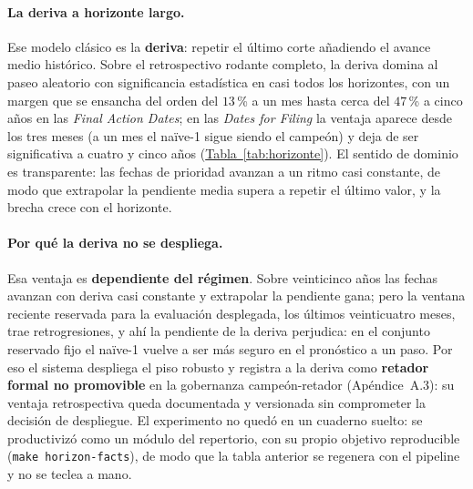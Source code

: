 \documentclass[12pt,letterpaper]{report}
\begin{document}
\paragraph{La deriva a horizonte largo.} Ese modelo clásico es la \textbf{deriva}: repetir el último
corte añadiendo el avance medio histórico. Sobre el retrospectivo rodante completo, la deriva
domina al paseo aleatorio con significancia estadística en casi todos los horizontes, con un
margen que se ensancha del orden del $13$\,\% a un mes hasta cerca del $47$\,\% a cinco años en
las \textit{Final Action Dates}; en las \textit{Dates for Filing} la ventaja aparece desde los tres
meses (a un mes el naïve-1 sigue siendo el campeón) y deja de ser significativa a cuatro y cinco años (\hyperref[tab:horizonte]{Tabla~\ref*{tab:horizonte}}). El
sentido de dominio es transparente: las fechas de prioridad avanzan a un ritmo casi constante, de
modo que extrapolar la pendiente media supera a repetir el último valor, y la brecha crece con el
horizonte.

\begin{table}[htbp]
\centering
\caption[Campeón por horizonte (retrospectivo rodante)]{Campeón por horizonte: MASE de la deriva y
del naïve-1, su diferencia porcentual y la significancia de Holm, por tabla y horizonte.
Retrospectivo rodante, solo estado F, escala canónica; no es el conjunto reservado fijo, donde el naïve-1 es
el piso desplegado.}
\label{tab:horizonte}

\end{table}

\paragraph{Por qué la deriva no se despliega.} Esa ventaja es \textbf{dependiente del régimen}.
Sobre veinticinco años las fechas avanzan con deriva casi constante y extrapolar la pendiente gana;
pero la ventana reciente reservada para la evaluación desplegada, los últimos veinticuatro meses,
trae retrogresiones, y ahí la pendiente de la deriva perjudica: en el conjunto reservado fijo el naïve-1
vuelve a ser más seguro en el pronóstico a un paso. Por eso el sistema despliega el piso robusto y
registra a la deriva como \textbf{retador formal no promovible} en la gobernanza campeón-retador
(Apéndice~A.3): su ventaja retrospectiva queda documentada y versionada sin comprometer la decisión
de despliegue. El experimento no quedó en un cuaderno suelto: se productivizó como un módulo del
repertorio, con su propio objetivo reproducible (\texttt{make horizon-facts}), de modo que la
tabla anterior se regenera con el pipeline y no se teclea a mano.
\end{document}
